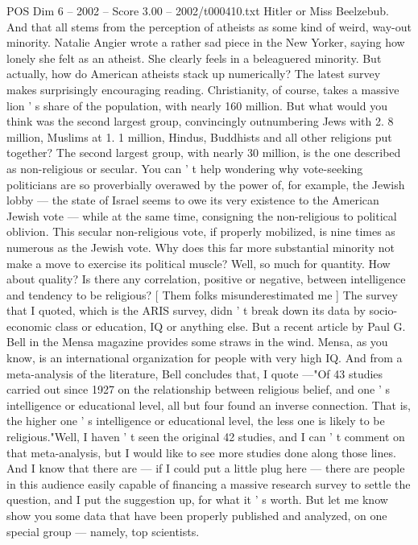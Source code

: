 \begin{textsample}{POS Dim 6 – 2002 – Score 3.00 – 2002/t000410.txt}
Hitler or Miss Beelzebub.
And that all stems from the perception of atheists as some kind of weird, way-out minority.
Natalie Angier wrote a rather sad piece in the New Yorker, saying how lonely she felt as an atheist.
She clearly feels in a beleaguered minority.
But actually, how do American atheists stack up numerically?
The latest survey makes surprisingly encouraging reading.
Christianity, of course, takes a massive lion ' s share of the population, with nearly 160 million.
But what would you think was the second largest group, convincingly outnumbering Jews with 2. 8 million, Muslims at 1. 1 million, Hindus, Buddhists and all other religions put together?
The second largest group, with nearly 30 million, is the one described as non-religious or secular.
You can ' t help wondering why vote-seeking politicians are so proverbially overawed by the power of, for example, the Jewish lobby — the state of Israel seems to owe its very existence to the American Jewish vote — while at the same time, consigning the non-religious to political oblivion.
This secular non-religious vote, if properly mobilized, is nine times as numerous as the Jewish vote.
Why does this far more substantial minority not make a move to exercise its political muscle?
Well, so much for quantity.
How about quality?
Is there any correlation, positive or negative, between intelligence and tendency to be religious? [ Them folks misunderestimated me ] The survey that I quoted, which is the ARIS survey, didn ' t break down its data by socio-economic class or education, IQ or anything else.
But a recent article by Paul G.
Bell in the Mensa magazine provides some straws in the wind.
Mensa, as you know, is an international organization for people with very high IQ.
And from a meta-analysis of the literature, Bell concludes that, I quote —"Of 43 studies carried out since 1927 on the relationship between religious belief, and one ' s intelligence or educational level, all but four found an inverse connection.
That is, the higher one ' s intelligence or educational level, the less one is likely to be religious."Well, I haven ' t seen the original 42 studies, and I can ' t comment on that meta-analysis, but I would like to see more studies done along those lines.
And I know that there are — if I could put a little plug here — there are people in this audience easily capable of financing a massive research survey to settle the question, and I put the suggestion up, for what it ' s worth.
But let me know show you some data that have been properly published and analyzed, on one special group — namely, top scientists.

\end{textsample}
